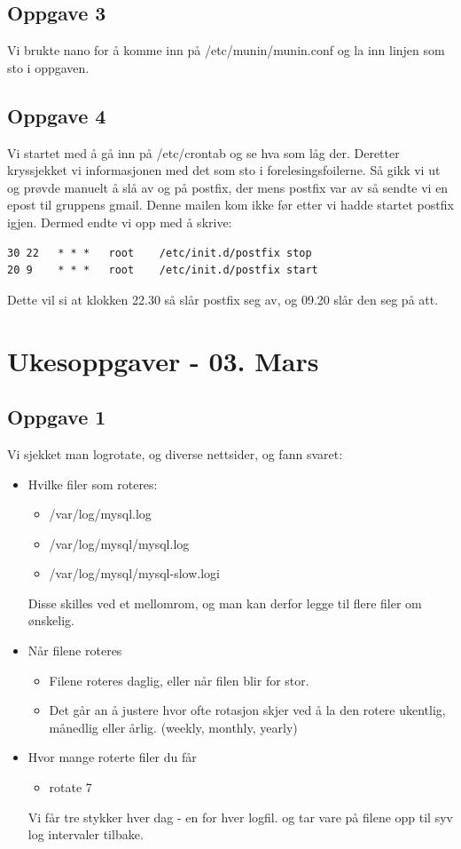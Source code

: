 \documentclass[a4paper, norsk, 12pt]{article}
\begin{document}
\subsection{Oppgave 3}
Vi brukte nano for å komme inn på /etc/munin/munin.conf og la inn linjen som sto i oppgaven.

\subsection{Oppgave 4}
Vi startet med å gå inn på /etc/crontab og se hva som låg der. Deretter kryssjekket vi informasjonen med det som sto i forelesingsfoilerne. Så gikk vi ut og prøvde manuelt å slå av og på postfix, der mens postfix var av så sendte vi en epost til gruppens gmail. Denne mailen kom ikke før etter vi hadde startet postfix igjen. Dermed endte vi opp med å skrive:
\begin{verbatim}
30 22   * * *   root    /etc/init.d/postfix stop
20 9    * * *   root    /etc/init.d/postfix start
\end{verbatim}
Dette vil si at klokken 22.30 så slår postfix seg av, og 09.20 slår den seg på att.


\section{Ukesoppgaver - 03. Mars}
\subsection{Oppgave 1}
Vi sjekket man logrotate, og diverse nettsider, og fann svaret:
\begin{itemize}
\item Hvilke filer som roteres:
\begin{itemize}
\item /var/log/mysql.log
\item /var/log/mysql/mysql.log
\item /var/log/mysql/mysql-slow.logi
\end{itemize}
Disse skilles ved et mellomrom, og man kan derfor legge til flere filer om ønskelig.

\item Når filene roteres
\begin{itemize}
\item Filene roteres daglig, eller når filen blir for stor.
\item Det går an å justere hvor ofte rotasjon skjer ved å la den rotere ukentlig, månedlig eller årlig. (weekly, monthly, yearly)
\end{itemize}
\item Hvor mange roterte filer du får
\begin{itemize}
\item rotate 7
\end{itemize}
Vi får tre stykker hver dag - en for hver logfil. og tar vare på filene opp til syv log intervaler tilbake.
\end{itemize}
\end{document}
